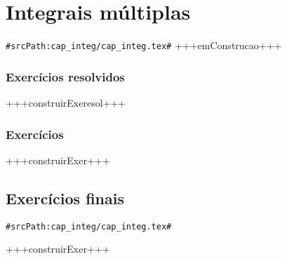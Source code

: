 
\chapter{Integrais múltiplas}
\verb+#srcPath:cap_integ/cap_integ.tex#+
\label{chap:integ}
+++emConstrucao+++




\subsection*{Exercícios resolvidos}
+++construirExeresol+++

\subsection*{Exercícios}
+++construirExer+++

\section{Exercícios finais}
\verb+#srcPath:cap_integ/cap_integ.tex#+

+++construirExer+++

